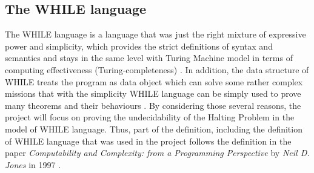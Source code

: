\documentclass{jfrarticle}
\begin{document}
\subsection{The WHILE language}
The WHILE language is a language that was just the right mixture of expressive power and simplicity, which provides the strict definitions of syntax and semantics and stays in the same level with Turing Machine model in terms of computing effectiveness (Turing-completeness) \cite{jones_computability_1997}. 
In addition, the data structure of WHILE treats the program as data object which can solve some rather complex missions that with the simplicity WHILE language can be simply used to prove many theorems and their behaviours \cite{jones_computability_1997}. 
By considering those several reasons, the project will focus on proving the undecidability of the Halting Problem in the model of WHILE language.
Thus, part of the definition, including the definition of WHILE language that was used in the project follows the definition in the paper \textit{Computability and Complexity: from a Programming Perspective} by \textit{Neil D. Jones} in 1997 \cite{jones_computability_1997}.
\end{document}
